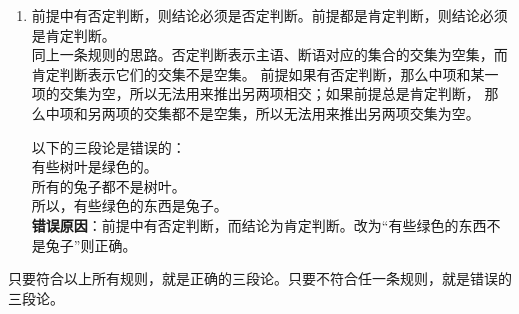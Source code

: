 \begin{enumerate}
    \item[4.] 前提中有否定判断，则结论必须是否定判断。前提都是肯定判断，则结论必须是肯定判断。\\
    同上一条规则的思路。否定判断表示主语、断语对应的集合的交集为空集，而肯定判断表示它们的交集不是空集。
    前提如果有否定判断，那么中项和某一项的交集为空，所以无法用来推出另两项相交；如果前提总是肯定判断，
    那么中项和另两项的交集都不是空集，所以无法用来推出另两项交集为空。
    \begin{ex*}
        以下的三段论是错误的： \\
        \indent 有些树叶是绿色的。\\
        \indent 所有的兔子都不是树叶。\\
        \indent 所以，有些绿色的东西是兔子。\\
        \textbf{错误原因}：前提中有否定判断，而结论为肯定判断。改为“有些绿色的东西不是兔子”则正确。
    \end{ex*}
\end{enumerate}
只要符合以上所有规则，就是正确的三段论。只要不符合任一条规则，就是错误的三段论。

